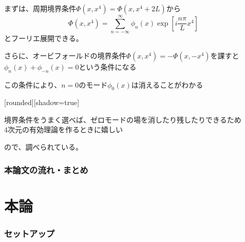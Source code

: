 \documentclass[
  unicode,a4paper,10pt,
  xcolor = {dvipsnames,svgnames},
  hyperref ={colorlinks=true,citecolor=Navy,linkcolor=NavyBlue,urlcolor=purple},
  ja=standard,lualatex
]{beamer}
\begin{document}
\begin{frame}
  \frametitle{}

  まずは、周期境界条件$\Phi(x,x^{4})=\Phi(x,x^{4}+2L)$から
  \begin{equation}
    \Phi(x,x^{4})
    =
    \sum_{n=-\infty}^{\infty}\phi_{n}(x) \exp \left[ i\frac{n\pi}{L}x^{4} \right]
    \nonumber
  \end{equation}
  とフーリエ展開できる。

  \vspace*{5pt}

  さらに、オービフォールドの境界条件$\Phi(x,x^{4})=-\Phi(x,-x^{4})$を課すと$\phi_{n}(x)+\phi_{-n}(x)=0$という条件になる

  \vspace*{5pt}

  この条件により、$n=0$のモード$\phi_{0}(x)$は消えることがわかる

  \pause
  \vspace*{5pt}

  [rounded][shadow=true]
  \begin{block}{}
    \centering
    境界条件をうまく選べば、ゼロモードの場を消したり残したりできるため
    \\
    4次元の有効理論を作るときに嬉しい
  \end{block}
  ので、調べられている。

\end{frame}


\begin{frame}
  \frametitle{本論文の流れ・まとめ}

  

\end{frame}


\section{本論}

\begin{frame}[plain]
  \huge \secname
\end{frame}

\begin{frame}
  \frametitle{セットアップ}



\end{frame}



\setcounter{Appendix}{\value{framenumber}}
\setcounter{section}{0}
\renewcommand{\thesubsection}{\Alph{subsection}}
\makeatletter
\renewcommand{\theequation}{\thesubsection.\arabic{equation}}
\end{document}
